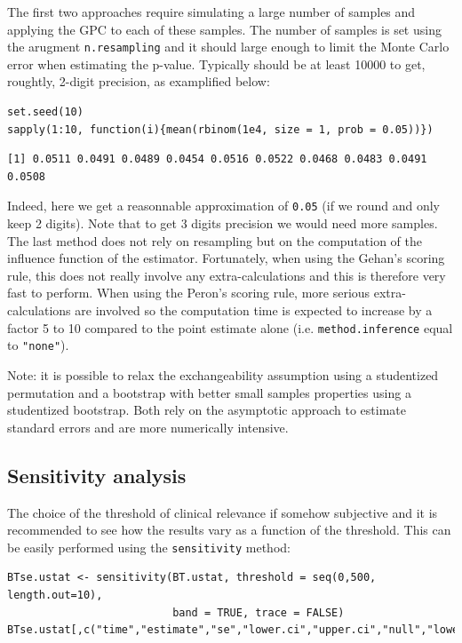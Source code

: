 \documentclass[12pt]{article}
\begin{document}
The first two approaches require simulating a large number of samples
and applying the GPC to each of these samples. The number of samples
is set using the arugment \texttt{n.resampling} and it should large enough to
limit the Monte Carlo error when estimating the p-value. Typically
should be at least 10000 to get, roughtly, 2-digit precision, as
examplified below:
\lstset{language=r,label= ,caption= ,captionpos=b,numbers=none}
\begin{lstlisting}
set.seed(10)
sapply(1:10, function(i){mean(rbinom(1e4, size = 1, prob = 0.05))})
\end{lstlisting}

\begin{verbatim}
[1] 0.0511 0.0491 0.0489 0.0454 0.0516 0.0522 0.0468 0.0483 0.0491 0.0508
\end{verbatim}

Indeed, here we get a reasonnable approximation of \texttt{0.05} (if we round
and only keep 2 digits). Note that to get 3 digits precision we would
need more samples. The last method does not rely on resampling but on
the computation of the influence function of the
estimator. Fortunately, when using the Gehan's scoring rule, this does
not really involve any extra-calculations and this is therefore very
fast to perform. When using the Peron's scoring rule, more serious
extra-calculations are involved so the computation time is expected to
increase by a factor 5 to 10 compared to the point estimate alone
(i.e. \texttt{method.inference} equal to \texttt{"none"}).

\bigskip

Note: it is possible to relax the exchangeability assumption using a
studentized permutation and a bootstrap with better small samples
properties using a studentized bootstrap. Both rely on the asymptotic
approach to estimate standard errors and are more numerically
intensive.

\clearpage

\subsection{Sensitivity analysis}
\label{sec:org6952ec8}

The choice of the threshold of clinical relevance if somehow
subjective and it is recommended to see how the results vary as a
function of the threshold. This can be easily performed using the
\texttt{sensitivity} method:
\lstset{language=r,label= ,caption= ,captionpos=b,numbers=none}
\begin{lstlisting}
BTse.ustat <- sensitivity(BT.ustat, threshold = seq(0,500, length.out=10),
                          band = TRUE, trace = FALSE)
BTse.ustat[,c("time","estimate","se","lower.ci","upper.ci","null","lower.band","upper.band")]
\end{lstlisting}
\end{document}
